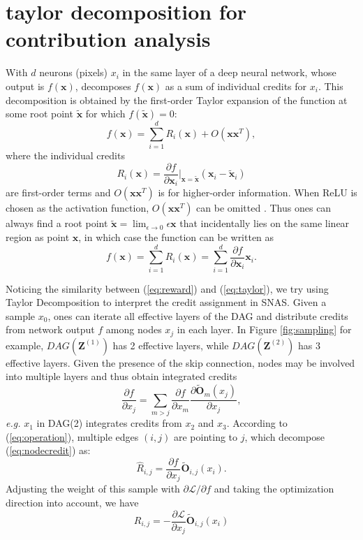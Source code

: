 \documentclass{article} \usepackage{iclr2019_conference,times}
\newcommand{\zh}{\color{black}}
\begin{document}
\section{taylor decomposition for {\zh contribution} analysis}
With $d$ neurons (pixels) $x_{i}$ in the same layer of a deep neural network, whose output is $f(\bm{x})$, \citet{montavon2017explaining} decomposes $f(\bm{x})$ as a sum of individual credits for $x_{i}$. This decomposition is obtained by the first-order Taylor expansion of the function at some root point $\tilde{\bm{x}}$ for which $f(\tilde{\bm{x}})=0$: 
\begin{equation}
f(\bm{x}) = \sum_{i=1}^{d}R_{i}(\bm{x})+O(\bm{x}\bm{x}^{T}), 
\end{equation}
where the individual credits
\begin{equation}
R_{i}(\bm{x})=\frac{\partial f}{\partial \bm{x}_{i}}|_{\bm{x}=\tilde{\bm{x}}}(\bm{x}_{i}-\tilde{\bm{x}}_{i})
\end{equation}
are first-order terms and $O(\bm{x}\bm{x}^{T})$ is for higher-order information. When ReLU is chosen as the activation function, $O(\bm{x}\bm{x}^{T})$ can be omitted \citep{montavon2017methods}. Thus ones can always find a root point $\bm{\tilde{x}}=\lim_{\epsilon \rightarrow 0}\epsilon \bm{x}$ that incidentally lies on the same linear region as point $\bm{x}$, in which case the function can be written as
\begin{equation}
f(\bm{x}) = \sum_{i=1}^{d}R_{i}(\bm{x}) = \sum_{i=1}^{d}\frac{\partial f}{\partial \bm{x}_{i}}\bm{x}_{i}. 
\label{eq:taylor}
\end{equation}

Noticing the similarity between (\ref{eq:reward}) and (\ref{eq:taylor}), we try using Taylor Decomposition to interpret the credit assignment in SNAS. Given a sample $x_{0}$, ones can iterate all effective layers of the DAG and distribute credits from network output $f$ among nodes $x_{j}$ in each layer. In Figure \ref{fig:sampling} for example, $DAG(\bm{Z}^{(1)})$ has 2 effective layers, while $DAG(\bm{Z}^{(2)})$ has 3 effective layers. Given the presence of the skip connection, nodes may be involved into multiple layers and thus obtain integrated credits
\begin{equation}
\frac{\partial f}{\partial x_{j}} = \sum_{m>j}\frac{\partial f}{\partial x_{m}}\frac{\partial \tilde{\bm{O}}_{m}(x_{j})}{\partial x_{j}},
\label{eq:nodecredit}
\end{equation} 
\textit{e.g.} $x_{1}$ in DAG(2) integrates credits from $x_{2}$ and $x_{3}$. According to (\ref{eq:operation}), {\zh multiple} edges $(i, j)$ are pointing to $j$, which decompose (\ref{eq:nodecredit}) as:
\begin{equation}
\hat{R}_{i, j}=\frac{\partial f}{\partial x_{j}}\tilde{\bm{O}}_{i, j}(x_{i}). 
\end{equation}
Adjusting the weight of this sample with $\partial \mathcal{L}/\partial f$ and taking the optimization direction into account, we have
\begin{equation}
R_{i, j}=-\frac{\partial \mathcal{L}}{\partial x_{j}}\tilde{\bm{O}}_{i, j}(x_{i})
\end{equation}
\end{document}
